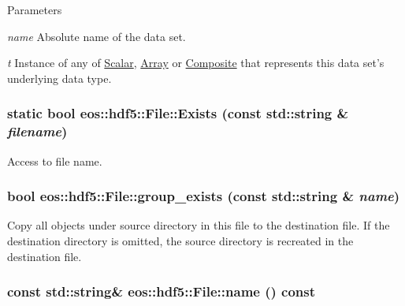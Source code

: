 \begin{DoxyParams}{Parameters}
\item[{\em name}]Absolute name of the data set. \item[{\em t}]Instance of any of \hyperlink{classeos_1_1hdf5_1_1Scalar}{Scalar}, \hyperlink{classeos_1_1hdf5_1_1Array}{Array} or \hyperlink{classeos_1_1hdf5_1_1Composite}{Composite} that represents this data set's underlying data type. \end{DoxyParams}
\hypertarget{classeos_1_1hdf5_1_1File_a907662df69926c556596304405846d7c}{
\subsubsection[{Exists}]{\setlength{\rightskip}{0pt plus 5cm}static bool eos::hdf5::File::Exists (const std::string \& {\em filename})}}
\label{classeos_1_1hdf5_1_1File_a907662df69926c556596304405846d7c}


Access to file name. \hypertarget{classeos_1_1hdf5_1_1File_addf73185e4946dea33eb40f04c985439}{
\subsubsection[{group\_\-exists}]{\setlength{\rightskip}{0pt plus 5cm}bool eos::hdf5::File::group\_\-exists (const std::string \& {\em name})}}
\label{classeos_1_1hdf5_1_1File_addf73185e4946dea33eb40f04c985439}
Copy all objects under source directory in this file to the destination file. If the destination directory is omitted, the source directory is recreated in the destination file. \hypertarget{classeos_1_1hdf5_1_1File_a3ae62d6317e16fab68dc7f345007ca59}{
\subsubsection[{name}]{\setlength{\rightskip}{0pt plus 5cm}const std::string\& eos::hdf5::File::name () const}}
\label{classeos_1_1hdf5_1_1File_a3ae62d6317e16fab68dc7f345007ca59}


